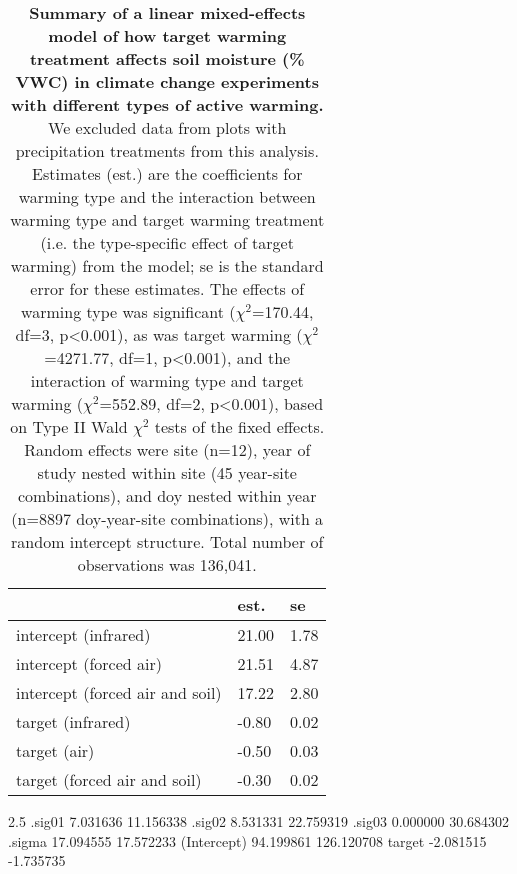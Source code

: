 \documentclass{article}
\begin{document}
\begin{table}[ht]
\centering
\caption{\textbf{Summary of a linear mixed-effects model of how target warming treatment affects soil moisture (\% VWC) in climate change experiments with different types of active warming.} We excluded data from plots with precipitation treatments from this analysis. Estimates (est.) are the coefficients for warming type and the interaction between warming type and target warming treatment (i.e. the type-specific effect of target warming) from the model; se is the standard error for these estimates. The effects of warming type was significant ($\chi^{2}$=170.44, df=3, p<0.001), as was target warming ($\chi^{2}$=4271.77, df=1, p<0.001), and the interaction of warming type and target warming ($\chi^{2}$=552.89, df=2, p<0.001), based on Type II Wald $\chi^{2}$ tests of the fixed effects. Random effects were site (n=12), year of study nested within site (45 year-site combinations), and doy nested within year (n=8897 doy-year-site combinations), with a random intercept structure. Total number of observations was 136,041.} 
\label{table:targsoilmois}
\begingroup\footnotesize
\begin{tabular}{|p{}|p{}p{}|}
  \hline
 & est. & se \\ 
  \hline
intercept (infrared) & 21.00 & 1.78 \\ 
  intercept (forced air) & 21.51 & 4.87 \\ 
  intercept (forced air and soil) & 17.22 & 2.80 \\ 
  target (infrared) & -0.80 & 0.02 \\ 
  target (air) & -0.50 & 0.03 \\ 
  target (forced air and soil) & -0.30 & 0.02 \\ 
   \hline
\end{tabular}
\endgroup
\end{table}\clearpage
                2.5 %
.sig01       7.031636  11.156338
.sig02       8.531331  22.759319
.sig03       0.000000  30.684302
.sigma      17.094555  17.572233
(Intercept) 94.199861 126.120708
target      -2.081515  -1.735735%
\end{document}
